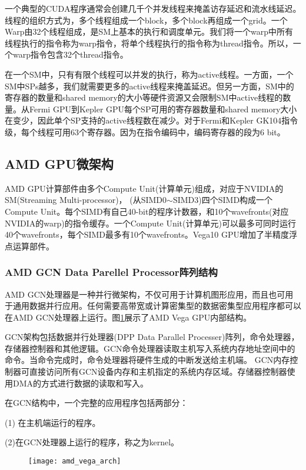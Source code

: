 一个典型的CUDA程序通常会创建几千个并发线程来掩盖访存延迟和流水线延迟。线程的组织方式为，多个线程组成一个block，多个block再组成一个grid。一个Warp由32个线程组成，是SM上基本的执行和调度单元。我们将一个warp中所有线程执行的指令称为warp指令，将单个线程执行的指令称为thread指令。所以，一个warp指令包含32个thread指令。

在一个SM中，只有有限个线程可以并发的执行，称为active线程。一方面，一个SM中SPs越多，我们就需要更多的active线程来掩盖延迟。但另一方面，SM中的寄存器的数量和shared memory的大小等硬件资源又会限制SM中active线程的数量。从Fermi GPU到Kepler GPU每个SP可用的寄存器数量和shared memory大小在变少，因此单个SP支持的active线程数在减少。对于Fermi和Kepler GK104指令级，每个线程可用63个寄存器。因为在指令编码中，编码寄存器的段为6 bit。

\subsection{AMD GPU微架构}
 AMD GPU计算部件由多个Compute Unit(计算单元)组成，对应于NVIDIA的SM(Streaming Multi-processor)， (从SIMD0$\sim$SIMD3)四个SIMD构成一个Compute Unit。每个SIMD有自己40-bit的程序计数器，和10个wavefronts(对应NVIDIA的warp)的指令缓存。一个Compute Unit(计算单元)可以最多可同时运行40个wavefronts，每个SIMD最多有10个wavefronts。Vega10 GPU增加了半精度浮点运算部件。



\subsubsection{AMD GCN Data Parellel Processor阵列结构}
 AMD GCN处理器是一种并行微架构，不仅可用于计算机图形应用，而且也可用于通用数据并行应用。任何需要高带宽或计算密集型的数据密集型应用程序都可以在AMD GCN处理器上运行。图\ref{fig:amd_vega_arch}展示了AMD Vega GPU内部结构。
 
 GCN架构包括数据并行处理器(DPP Data Parallel Processer)阵列，命令处理器，存储器控制器和其他逻辑。GCN命令处理器读取主机写入系统内存地址空间中的命令。当命令完成时，命令处理器将硬件生成的中断发送给主机端。 GCN内存控制器可直接访问所有GCN设备内存和主机指定的系统内存区域。存储器控制器使用DMA的方式进行数据的读取和写入。
 
 在GCN结构中，一个完整的应用程序包括两部分：
 
(1) 在主机端运行的程序。
 
(2)在GCN处理器上运行的程序，称之为kernel。
 
\begin{figure}[htbp]
	\centering
	\texttt{[image: amd\_vega\_arch]}
	\label{fig:amd_vega_arch}
\end{figure}

